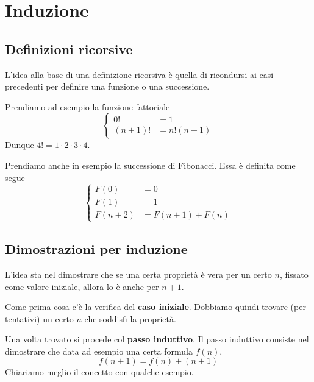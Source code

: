 \section{Induzione}
\subsection{Definizioni ricorsive}
L'idea alla base di una definizione ricorsiva \`e quella di ricondursi ai casi
precedenti per definire una funzione o una successione.

\begin{example}
	Prendiamo ad esempio la funzione fattoriale
	\begin{equation*}
		\begin{cases}
			0!       & = 1          \\
			(n + 1)! & = n! (n + 1)
		\end{cases}
	\end{equation*}
	Dunque $4! = 1 \cdot 2 \cdot 3 \cdot 4$.
\end{example}

\begin{example}
	Prendiamo anche in esempio la successione di Fibonacci. Essa \`e definita come
	segue
	\begin{equation*}
		\begin{cases}
			F(0)     & = 0               \\
			F(1)     & = 1               \\
			F(n + 2) & = F(n + 1) + F(n)
		\end{cases}
	\end{equation*}
\end{example}

\subsection{Dimostrazioni per induzione}
L'idea sta nel dimostrare che se una certa propriet\`a \`e vera per un certo $n$,
fissato come valore iniziale, allora lo \`e anche per $n + 1$.

Come prima cosa c'\`e la verifica del \textbf{caso iniziale}. Dobbiamo quindi trovare
(per tentativi) un certo $n$ che soddisfi la propriet\`a.

Una volta trovato si procede
col \textbf{passo induttivo}. Il passo induttivo consiste nel dimostrare che data
ad esempio una certa formula $f(n)$,
\begin{equation*}
	f(n + 1) = f(n) + (n + 1)
\end{equation*}
Chiariamo meglio il concetto con qualche esempio.

